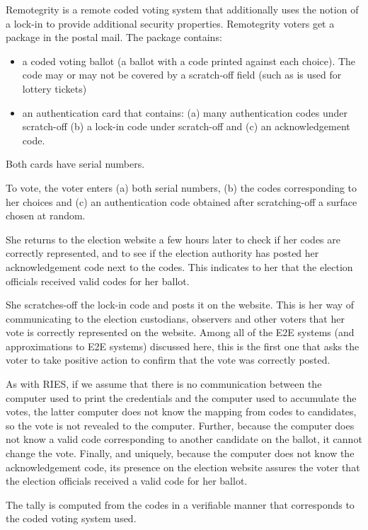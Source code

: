Remotegrity is a remote coded voting system that additionally uses the
notion of a lock-in to provide additional security
properties. Remotegrity voters get a package in the postal mail. The
package contains:
\begin{itemize}
  \item a coded voting ballot (a ballot with a code printed against
    each choice). The code may or may not be covered by a scratch-off
    field (such as is used for lottery tickets)
  \item an authentication card that contains: (a) many authentication
    codes under scratch-off (b) a lock-in code under scratch-off and
    (c) an acknowledgement code.
\end{itemize}
Both cards have serial numbers.

To vote, the voter enters (a) both serial numbers, (b) the codes
corresponding to her choices and (c) an authentication code obtained
after scratching-off a surface chosen at random.

She returns to the election website a few hours later to check if her
codes are correctly represented, and to see if the election authority
has posted her acknowledgement code next to the codes. This indicates
to her that the election officials received valid codes for her
ballot.

She scratches-off the lock-in code and posts it on the website. This
is her way of communicating to the election custodians, observers and
other voters that her vote is correctly represented on the
website. Among all of the E2E systems (and approximations to E2E
systems) discussed here, this is the first one that asks the voter to
take positive action to confirm that the vote was correctly posted.

As with RIES, if we assume that there is no communication between the
computer used to print the credentials and the computer used to
accumulate the votes, the latter computer does not know the mapping
from codes to candidates, so the vote is not revealed to the
computer. Further, because the computer does not know a valid code
corresponding to another candidate on the ballot, it cannot change the
vote.  Finally, and uniquely, because the computer does not know the
acknowledgement code, its presence on the election website assures the
voter that the election officials received a valid code for her
ballot.

The tally is computed from the codes in a verifiable manner that
corresponds to the coded voting system used.

